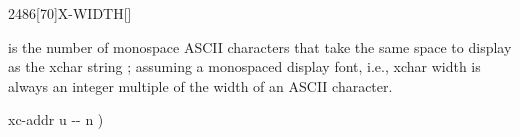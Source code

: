 \vspace*{-0.75ex}
\begin{worddef}{2486}[70]{X-WIDTH}[]
\item {}

	 is the number of monospace ASCII characters that take the same
	space to display as the xchar string ; assuming a
	monospaced display font, i.e., xchar width is always an integer multiple
	of the width of an ASCII character.

	\begin{implement}
	\word{:}   xc-addr u -{}- n ) \\
	    \word{+}   \\
	\tab[2]      \word{+} \\
	\tab {}  \word{-}  \word{;}
	\end{implement}
\end{worddef}



